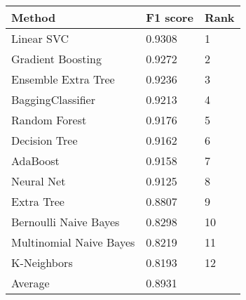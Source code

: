 \begin{tabular}{|l|l|l| }
\hline
Method                  & F1 score & Rank \\ \hline
Linear SVC              & 0.9308 & 1\\
Gradient Boosting       & 0.9272 & 2\\
Ensemble Extra Tree     & 0.9236 & 3\\
BaggingClassifier       & 0.9213 & 4\\
Random Forest           & 0.9176 & 5\\
Decision Tree           & 0.9162 & 6\\
AdaBoost                & 0.9158 & 7\\
Neural Net              & 0.9125 & 8\\
Extra Tree              & 0.8807 & 9\\
Bernoulli Naive Bayes   & 0.8298 & 10\\
Multinomial Naive Bayes & 0.8219 & 11\\
K-Neighbors             & 0.8193 & 12\\
Average & 0.8931 & \\
\hline
\end{tabular}